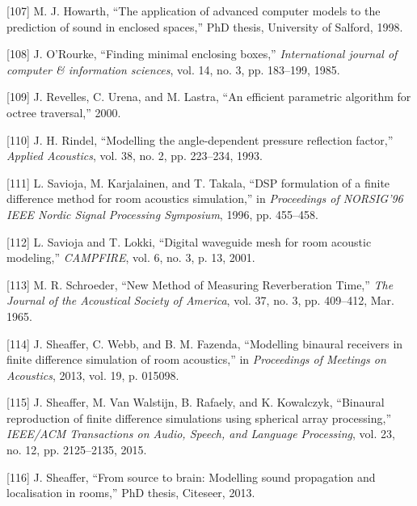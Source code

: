 \documentclass[]{scrreprt}
\begin{document}
\hypertarget{ref-howarthux5fapplicationux5f1998}{}
{[}107{]} M. J. Howarth, ``The application of advanced computer models
to the prediction of sound in enclosed spaces,'' PhD thesis, University
of Salford, 1998.

\hypertarget{ref-orourkeux5ffindingux5f1985}{}
{[}108{]} J. O'Rourke, ``Finding minimal enclosing boxes,''
\emph{International journal of computer \& information sciences}, vol.
14, no. 3, pp. 183--199, 1985.

\hypertarget{ref-revellesux5fefficientux5f2000}{}
{[}109{]} J. Revelles, C. Urena, and M. Lastra, ``An efficient
parametric algorithm for octree traversal,'' 2000.

\hypertarget{ref-rindelux5fmodellingux5f1993}{}
{[}110{]} J. H. Rindel, ``Modelling the angle-dependent pressure
reflection factor,'' \emph{Applied Acoustics}, vol. 38, no. 2, pp.
223--234, 1993.

\hypertarget{ref-saviojaux5fdspux5f1996}{}
{[}111{]} L. Savioja, M. Karjalainen, and T. Takala, ``DSP formulation
of a finite difference method for room acoustics simulation,'' in
\emph{Proceedings of NORSIG'96 IEEE Nordic Signal Processing Symposium},
1996, pp. 455--458.

\hypertarget{ref-saviojaux5fdigitalux5f2001}{}
{[}112{]} L. Savioja and T. Lokki, ``Digital waveguide mesh for room
acoustic modeling,'' \emph{CAMPFIRE}, vol. 6, no. 3, p. 13, 2001.

\hypertarget{ref-schroederux5fnewux5f1965}{}
{[}113{]} M. R. Schroeder, ``New Method of Measuring Reverberation
Time,'' \emph{The Journal of the Acoustical Society of America}, vol.
37, no. 3, pp. 409--412, Mar. 1965.

\hypertarget{ref-sheafferux5fmodellingux5f2013}{}
{[}114{]} J. Sheaffer, C. Webb, and B. M. Fazenda, ``Modelling binaural
receivers in finite difference simulation of room acoustics,'' in
\emph{Proceedings of Meetings on Acoustics}, 2013, vol. 19, p. 015098.

\hypertarget{ref-sheafferux5fbinauralux5f2015}{}
{[}115{]} J. Sheaffer, M. Van Walstijn, B. Rafaely, and K. Kowalczyk,
``Binaural reproduction of finite difference simulations using spherical
array processing,'' \emph{IEEE/ACM Transactions on Audio, Speech, and
Language Processing}, vol. 23, no. 12, pp. 2125--2135, 2015.

\hypertarget{ref-sheafferux5fsourceux5f2013}{}
{[}116{]} J. Sheaffer, ``From source to brain: Modelling sound
propagation and localisation in rooms,'' PhD thesis, Citeseer, 2013.
\end{document}
